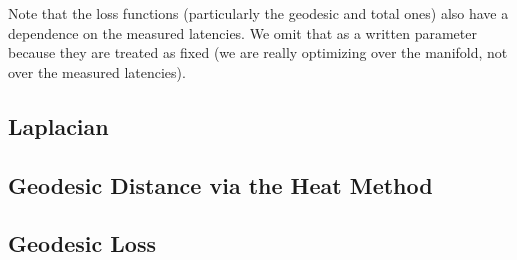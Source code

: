 \documentclass[10pt]{article}
\begin{document}
	Note that the loss functions (particularly the geodesic and total ones) also have a dependence on the measured latencies. We omit that as a written parameter because they are treated as fixed (we are really optimizing over the manifold, not over the measured latencies).

	\subsection{Laplacian}
	

	\subsection{Geodesic Distance via the Heat Method}
	

	\subsection{Geodesic Loss}
	
\end{document}
